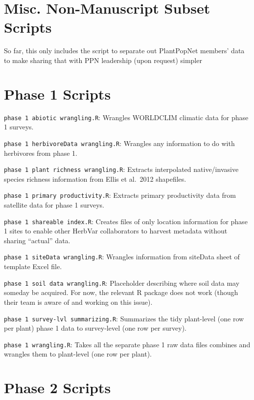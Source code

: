 \documentclass[
  letterpaper,
  DIV=11,
  numbers=noendperiod]{scrreprt}
\begin{document}
\section{Misc. Non-Manuscript Subset
Scripts}\label{misc.-non-manuscript-subset-scripts}

So far, this only includes the script to separate out PlantPopNet
members' data to make sharing that with PPN leadership (upon request)
simpler

\section{Phase 1 Scripts}\label{phase-1-scripts}

\texttt{phase\ 1\ abiotic\ wrangling.R}: Wrangles WORLDCLIM climatic
data for phase 1 surveys.

\texttt{phase\ 1\ herbivoreData\ wrangling.R}: Wrangles any information
to do with herbivores from phase 1.

\texttt{phase\ 1\ plant\ richness\ wrangling.R}: Extracts interpolated
native/invasive species richness information from Ellis et al.~2012
shapefiles.

\texttt{phase\ 1\ primary\ productivity.R}: Extracts primary
productivity data from satellite data for phase 1 surveys.

\texttt{phase\ 1\ shareable\ index.R}: Creates files of only location
information for phase 1 sites to enable other HerbVar collaborators to
harvest metadata without sharing ``actual'' data.

\texttt{phase\ 1\ siteData\ wrangling.R}: Wrangles information from
siteData sheet of template Excel file.

\texttt{phase\ 1\ soil\ data\ wrangling.R}: Placeholder describing where
soil data may someday be acquired. For now, the relevant R package does
not work (though their team is aware of and working on this issue).

\texttt{phase\ 1\ survey-lvl\ summarizing.R}: Summarizes the tidy
plant-level (one row per plant) phase 1 data to survey-level (one row
per survey).

\texttt{phase\ 1\ wrangling.R}: Takes all the separate phase 1 raw data
files combines and wrangles them to plant-level (one row per plant).

\section{Phase 2 Scripts}\label{phase-2-scripts}
\end{document}
